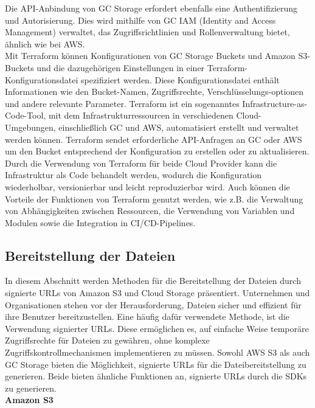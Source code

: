 Die API-Anbindung von GC Storage erfordert ebenfalls eine Authentifizierung und Autorisierung. Dies wird mithilfe von GC IAM (Identity and Access Management) verwaltet, das Zugriffsrichtlinien und Rollenverwaltung bietet, ähnlich wie bei AWS.\\

Mit Terraform können Konfigurationen von GC Storage Buckets und Amazon S3-Buckets und die dazugehörigen Einstellungen in einer Terraform-Konfigurationsdatei spezifiziert werden. Diese Konfigurationsdatei enthält Informationen wie den Bucket-Namen, Zugriffsrechte, Verschlüsselungs-optionen und andere relevante Parameter. Terraform ist ein sogenanntes Infrastructure-as-Code-Tool, mit dem Infrastrukturressourcen in verschiedenen Cloud-Umgebungen, einschließlich GC und AWS, automatisiert erstellt und verwaltet werden können. Terraform sendet erforderliche API-Anfragen an GC oder AWS um den Bucket entsprechend der Konfiguration zu erstellen oder zu aktualisieren. Durch die Verwendung von Terraform für beide Cloud Provider kann die Infrastruktur als Code behandelt werden, wodurch die Konfiguration wiederholbar, versionierbar und leicht reproduzierbar wird. Auch können die Vorteile der Funktionen von Terraform genutzt werden, wie z.B. die Verwaltung von Abhängigkeiten zwischen Ressourcen, die Verwendung von Variablen und Modulen sowie die Integration in CI/CD-Pipelines.

\newpage

\subsection{Bereitstellung der Dateien}

In diesem Abschnitt werden Methoden für die Bereitstellung der Dateien durch signierte URLs von Amazon S3 und Cloud Storage präsentiert. Unternehmen und Organisationen stehen vor der Herausforderung, Dateien sicher und effizient für ihre Benutzer bereitzustellen. Eine häufig dafür verwendete Methode, ist die Verwendung signierter URLs. Diese ermöglichen es, auf einfache Weise temporäre Zugriffsrechte für Dateien zu gewähren, ohne komplexe Zugriffskontrollmechanismen implementieren zu müssen. Sowohl AWS S3 als auch GC Storage bieten die Möglichkeit, signierte URLs für die Dateibereitstellung zu generieren. Beide bieten ähnliche Funktionen an, signierte URLs durch die SDKs zu generieren. \\

\textbf{Amazon S3}\\

